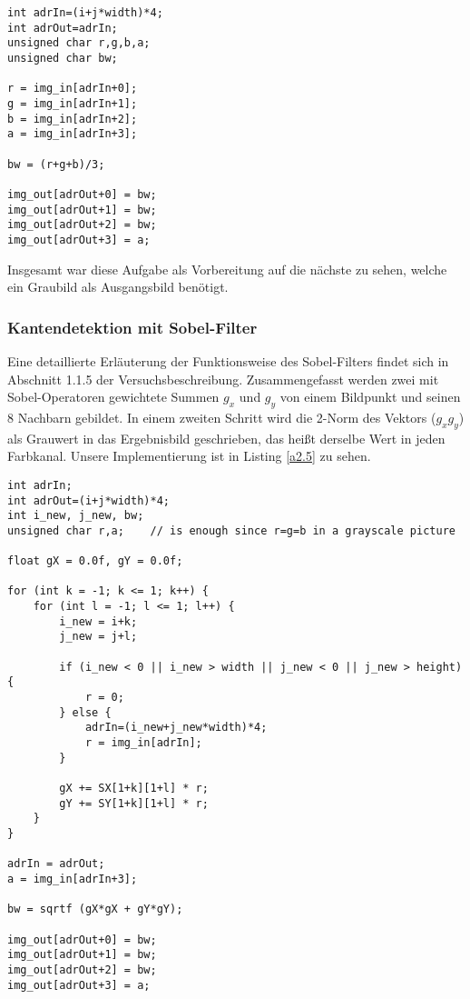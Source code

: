 \documentclass[12pt,a4paper]{scrartcl}
\begin{document}
\begin{lstlisting}[caption=bwKernel,label=a2.4]
int adrIn=(i+j*width)*4;
int adrOut=adrIn;
unsigned char r,g,b,a;
unsigned char bw;

r = img_in[adrIn+0];
g = img_in[adrIn+1];
b = img_in[adrIn+2];
a = img_in[adrIn+3];

bw = (r+g+b)/3;

img_out[adrOut+0] = bw;
img_out[adrOut+1] = bw;
img_out[adrOut+2] = bw;
img_out[adrOut+3] = a;
\end{lstlisting}

Insgesamt war diese Aufgabe als Vorbereitung auf die n\"achste zu sehen, welche ein Graubild als Ausgangsbild ben\"otigt.

\subsubsection{Kantendetektion mit Sobel-Filter}
Eine detaillierte Erl\"auterung der Funktionsweise des Sobel-Filters findet sich in Abschnitt 1.1.5 der Versuchsbeschreibung.
Zusammengefasst werden zwei mit Sobel-Operatoren gewichtete Summen $g_x$ und $g_y$ von einem Bildpunkt und seinen 8 Nachbarn gebildet.
In einem zweiten Schritt wird die 2-Norm des Vektors ($g_x g_y$) als Grauwert in das Ergebnisbild geschrieben, das hei\ss t derselbe Wert in jeden Farbkanal.
Unsere Implementierung ist in Listing \ref{a2.5} zu sehen.

\begin{lstlisting}[caption=sobelKernel,label=a2.5]
int adrIn;
int adrOut=(i+j*width)*4;
int i_new, j_new, bw;
unsigned char r,a;    // is enough since r=g=b in a grayscale picture

float gX = 0.0f, gY = 0.0f;

for (int k = -1; k <= 1; k++) {
    for (int l = -1; l <= 1; l++) {
        i_new = i+k;
        j_new = j+l;

        if (i_new < 0 || i_new > width || j_new < 0 || j_new > height) {
            r = 0;
        } else {
            adrIn=(i_new+j_new*width)*4;
            r = img_in[adrIn];
        }

        gX += SX[1+k][1+l] * r;
        gY += SY[1+k][1+l] * r;
    }
}

adrIn = adrOut;
a = img_in[adrIn+3];

bw = sqrtf (gX*gX + gY*gY);

img_out[adrOut+0] = bw;
img_out[adrOut+1] = bw;
img_out[adrOut+2] = bw;
img_out[adrOut+3] = a;
\end{lstlisting}
\end{document}
